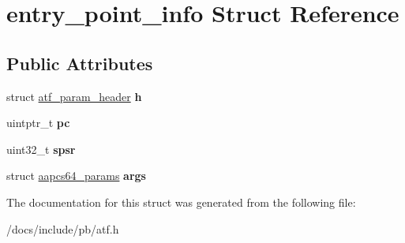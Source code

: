\hypertarget{structentry__point__info}{}\section{entry\+\_\+point\+\_\+info Struct Reference}
\label{structentry__point__info}
\subsection*{Public Attributes}
\begin{DoxyCompactItemize}
\item 
\mbox{\label{structentry__point__info_aa708290136c422f350aa3c7149b88da6}} 
struct \hyperlink{structatf__param__header}{atf\+\_\+param\+\_\+header} {\bfseries h}
\item 
\mbox{\label{structentry__point__info_ab4244cfe6135f947cfb85fb585f70a1b}} 
uintptr\+\_\+t {\bfseries pc}
\item 
\mbox{\label{structentry__point__info_a4256aa23b3d15650e82531eb600cbb01}} 
uint32\+\_\+t {\bfseries spsr}
\item 
\mbox{\label{structentry__point__info_a2da08358a9dd8e225489d34d8a05f75e}} 
struct \hyperlink{structaapcs64__params}{aapcs64\+\_\+params} {\bfseries args}
\end{DoxyCompactItemize}


The documentation for this struct was generated from the following file\+:\begin{DoxyCompactItemize}
\item 
/docs/include/pb/atf.\+h\end{DoxyCompactItemize}
